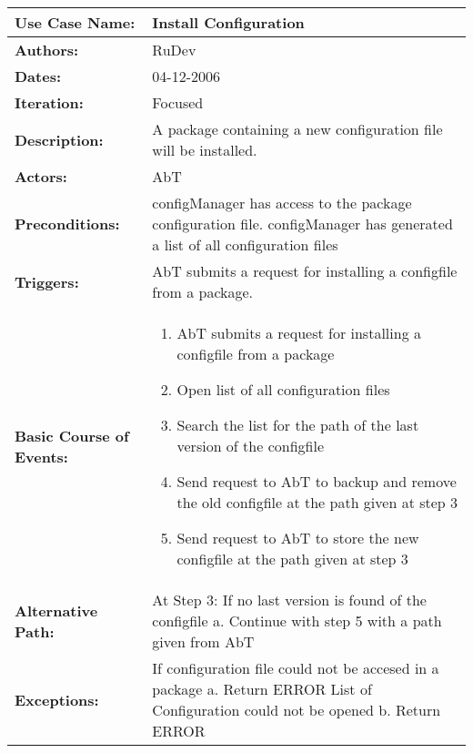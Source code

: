\begin{tabularx}{\linewidth}{|l|X|}
\hline
\textbf{Use Case Name:} & \textbf{Install Configuration} \\
\hline
\textbf{Authors:} & RuDev \\
\hline
\textbf{Dates:} & 04-12-2006 \\
\hline
\textbf{Iteration:} & Focused \\
\hline
\textbf{Description:} & A package containing a new configuration file will be installed. \\
\hline
\textbf{Actors:} & AbT \\
\hline
\textbf{Preconditions:} & configManager has access to the package configuration file. \newline configManager has generated a list of all configuration files \\
\hline
\textbf{Triggers:} & AbT submits a request for installing a configfile from a package. \\
\hline
\textbf{Basic Course of Events:} & 
\begin{minipage}{\linewidth} 
  \vspace{0.05em}
  \begin{enumerate}
   \item AbT submits a request for installing a configfile from a package
   \item Open list of all configuration files 
   \item Search the list for the path of the last version of the configfile
   \item Send request to AbT to backup and remove the old configfile at the path given at step 3
   \item Send request to AbT to store the new configfile at the path given at step 3
  \end{enumerate}
  \vspace{0.05em}
\end{minipage}
\\
\hline 
\textbf{Alternative Path:} & At Step 3: If no last version is found of the configfile \newline a. Continue with step 5 with a path given from AbT  \\
\hline
\textbf{Exceptions:} & If configuration file could not be accesed in a package \newline a. Return ERROR \newline\newline List of Configuration could not be opened \newline b. Return ERROR \\

\end{tabularx}

